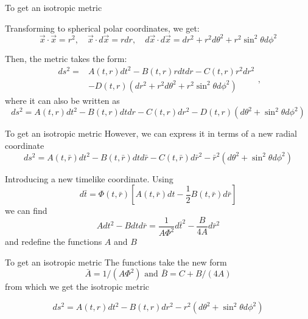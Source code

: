 \documentclass[xcolor=dvipsnames]{beamer}
\begin{document}
\begin{frame}{To get an isotropic metric}
\begin{exampleblock}
{}Transforming to spherical polar coordinates, we get:
    $$
\vec{x} \cdot \vec{x}=r^{2}, \quad \vec{x} \cdot d \vec{x}=r d r, \quad d \vec{x} \cdot d \vec{x}=d r^{2}+r^{2} d \theta^{2}+r^{2} \sin ^{2} \theta d \phi^{2}
$$
\end{exampleblock}
Then, the metric takes the form:
$$
\begin{aligned}
d s^{2}=& A(t, r) d t^{2}-B(t, r) r d t d r-C(t, r) r^{2} d r^{2} \\
&-D(t, r)\left(d r^{2}+r^{2} d \theta^{2}+r^{2} \sin ^{2} \theta d \phi^{2}\right)
\end{aligned},
$$
where it can also be written as
$$
d s^{2}=A(t, r) d t^{2}-B(t, r) d t d r-C(t, r) d r^{2}-D(t, r)\left(d \theta^{2}+\sin ^{2} \theta d \phi^{2}\right)
$$
\end{frame}
\begin{frame}{To get an isotropic metric}
    However, we can express it in terms of a new radial coordinate
    $$
d s^{2}=A(t, \bar{r}) d t^{2}-B(t, \bar{r}) d t d \bar{r}-C(t, \bar{r}) d \bar{r}^{2}-\bar{r}^{2}\left(d \theta^{2}+\sin ^{2} \theta d \phi^{2}\right)
$$
\begin{block}
{Introducing a new timelike coordinate.}
Using
$$
d \bar{t}=\Phi(t, \bar{r})\left[A(t, \bar{r}) d t-\frac{1}{2} B(t, \bar{r}) d \bar{r}\right]
$$
we can find
$$
A d t^{2}-B d t d \bar{r}=\frac{1}{A \Phi^{2}} d \bar{t}^{2}-\frac{B}{4 A} d \bar{r}^{2}
$$
and redefine the functions $A$ and $B$
\end{block}
\end{frame}
\begin{frame}{To get an isotropic metric}
    The functions take the new form
    $$
\bar{A}=1 /\left(A \Phi^{2}\right) \text { and } \bar{B}=C+B /(4 A)
$$
from which we get the isotropic metric
\begin{block}
{}$$
d s^{2}=A(t, r) d t^{2}-B(t, r) d r^{2}-r^{2}\left(d \theta^{2}+\sin ^{2} \theta d \phi^{2}\right)
$$

\end{block}
\end{frame}
\end{document}

